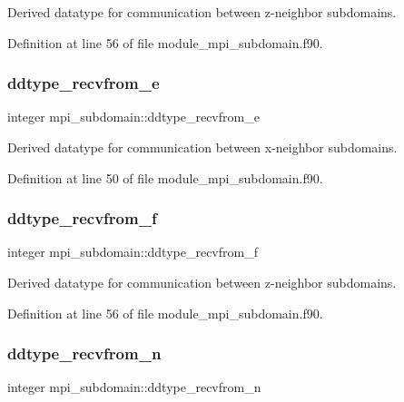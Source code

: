 Derived datatype for communication between z-\/neighbor subdomains. 



Definition at line 56 of file module\+\_\+mpi\+\_\+subdomain.\+f90.

\mbox{\label{namespacempi__subdomain_a18a84c0f3ca27cd4dd73057ff035f341}} 
\subsubsection{\texorpdfstring{ddtype\_recvfrom\_e}{ddtype\_recvfrom\_e}}
{\footnotesize\ttfamily integer mpi\+\_\+subdomain\+::ddtype\+\_\+recvfrom\+\_\+e}



Derived datatype for communication between x-\/neighbor subdomains. 



Definition at line 50 of file module\+\_\+mpi\+\_\+subdomain.\+f90.

\mbox{\label{namespacempi__subdomain_a4da19838e8bc3934ad5c24db424bec2c}} 
\subsubsection{\texorpdfstring{ddtype\_recvfrom\_f}{ddtype\_recvfrom\_f}}
{\footnotesize\ttfamily integer mpi\+\_\+subdomain\+::ddtype\+\_\+recvfrom\+\_\+f}



Derived datatype for communication between z-\/neighbor subdomains. 



Definition at line 56 of file module\+\_\+mpi\+\_\+subdomain.\+f90.

\mbox{\label{namespacempi__subdomain_a74f1edb3c9227692b250285680518dc4}} 
\subsubsection{\texorpdfstring{ddtype\_recvfrom\_n}{ddtype\_recvfrom\_n}}
{\footnotesize\ttfamily integer mpi\+\_\+subdomain\+::ddtype\+\_\+recvfrom\+\_\+n}



